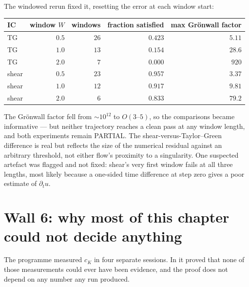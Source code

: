 The windowed rerun fixed it, resetting the error at each window start:

\begin{center}
\small
\begin{tabular}{@{}l r r r r@{}}
\toprule
IC & window \(W\) & windows & fraction satisfied & max Gr\"onwall factor \\
\midrule
TG & \(0.5\) & \(26\) & \(0.423\) & \(5.11\) \\
TG & \(1.0\) & \(13\) & \(0.154\) & \(28.6\) \\
TG & \(2.0\) & \(7\)  & \(0.000\) & \(920\) \\
shear & \(0.5\) & \(23\) & \(\mathbf{0.957}\) & \(3.37\) \\
shear & \(1.0\) & \(12\) & \(0.917\) & \(9.81\) \\
shear & \(2.0\) & \(6\)  & \(0.833\) & \(79.2\) \\
\bottomrule
\end{tabular}
\end{center}

\medskip
The Gr\"onwall factor fell from \(\sim10^{12}\) to \(O(3\text{--}5)\), so the
comparisons became informative --- but neither trajectory reaches a clean pass
at any window length, and both experiments remain \textsf{PARTIAL}. The
shear-versus-Taylor--Green difference is real but reflects the size of the
numerical residual against an arbitrary threshold, not either flow's proximity
to a singularity. One suspected artefact was flagged and not fixed: shear's
very first window fails at all three lengths, most likely because a one-sided
time difference at step zero gives a poor estimate of \(\partial_tu\).

\section{Wall 6: why most of this chapter could not decide anything}
\label{sec:wall6}

The programme measured \(c_K\) in four separate sessions. In  it proved
that none of those measurements could ever have been evidence, and the proof
does not depend on any number any run produced.

